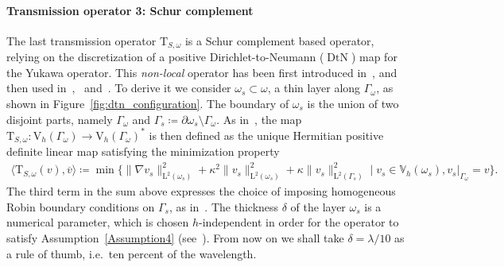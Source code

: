 \documentclass[a4paper,11pt]{article}
\newcommand{\mL}{\mathrm{L}}
\newcommand{\mT}{\mathrm{T}}
\newcommand{\mbV}{\mathbb{V}}
\newcommand{\Vh}{\mathrm{V}_{h}}
\DeclareMathOperator{\DtN}{DtN} %
\begin{document}
\paragraph{Transmission operator 3: Schur complement}
The last transmission operator \(\mT_{S,\omega}\) is a Schur complement
based operator, relying on the discretization of a positive
Dirichlet-to-Neumann (\(\DtN\)) map for the Yukawa operator. This
\emph{non-local} operator has been first introduced
in~\cite[Chapter~8]{Parolin2020NOD}, and then used
in~\cite{CollinoJolyEtAl2022NLI},~\cite[Section~4.2]{ClaeysCollinoEtAl2022NOS}
and~\cite[Section~6]{AtchekzaiClaeys2024ANL}. To derive it we consider
\(\omega_s \subset \omega\), a thin layer along \(\Gamma_{\omega}\), as
shown in Figure~\ref{fig:dtn_configuration}. The boundary of \(\omega_s\)
is the union of two disjoint parts, namely \(\Gamma_{\omega}\) and
\(\Gamma_s \coloneqq \partial \omega_s \setminus \Gamma_{\omega}\).  As
in~\cite[Section~6]{AtchekzaiClaeys2024ANL}, the map \(\mT_{S,\omega}:
\Vh(\Gamma_{\omega}) \rightarrow \Vh(\Gamma_{\omega})^* \) is then defined
as the unique Hermitian positive definite linear map satisfying the
minimization property
\begin{align*}
  \langle \mT_{S,\omega}(v), \overline{v} \rangle \coloneqq \min \lbrace
  \lVert \nabla v_s \rVert_{\mL^2(\omega_s)}^2 + \kappa^2 \lVert v_s
  \rVert_{\mL^2(\omega_s)}^2 + \kappa \lVert v_s \rVert_{\mL^2(\Gamma_s)}^2
  \mid v_s \in \mbV_h(\omega_s), v_s|_{\Gamma_{\omega}}=v\rbrace.
\end{align*}
The third term in the sum above expresses the choice of imposing
homogeneous Robin boundary conditions on \(\Gamma_s\), as
in~\cite[Section~8.3]{Parolin2020NOD}. The thickness \(\delta\) of the
layer \(\omega_s\) is a numerical parameter, which is chosen
\(h\)-independent in order for the operator to satisfy
Assumption~\eqref{Assumption4}
(see~\cite[Section~8.3.3]{Parolin2020NOD}). From now on we shall take
\(\delta = \lambda/10\) as a rule of thumb, i.e.~ten percent of the
wavelength.
\end{document}
